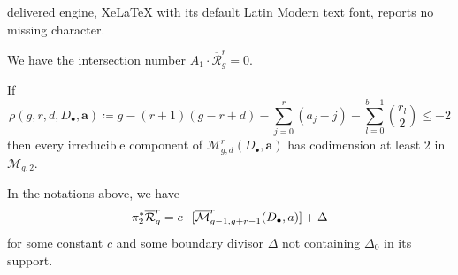 \documentclass[10pt,a4paper]{amsart}
\def\cM{\mathcal{M}}
\def\mm{\overline{\mathcal{M}}}
\def\rr{\overline{\mathcal{R}}}
\begin{document}
delivered engine, XeLaTeX with its default Latin Modern text font, reports no missing character.
\begin{prop} \label{testA_1}
	We have the intersection number $A_1\cdot \rr_g^r = 0$.
\end{prop}

\begin{prop} \label{rho-2} If 
	\[ \rho(g,r,d, D_\bullet, \textbf{a}) \coloneqq g-(r+1)(g-r+d)- \sum_{j=0}^{r}(a_j-j) - \sum_{l=0}^{b-1}\binom{r_l}{2} \leq -2 \]
	then every irreducible component of $\cM_{g,d}^r(D_\bullet, \textbf{a})$ has codimension at least $2$ in $\cM_{g,2}$.
\end{prop}

\begin{prop} \label{sBNpull} \normalfont In the notations above, we have 
	\[\pi_2^*\rr^r_g =  c\cdot[\mm^r_{g-1, g+r-1}\text{\large (}D_{\bullet}, \textbf{a}\text{\large )}] + \Delta \] 
	for some constant $c$ and some boundary divisor $\Delta$ not containing $\Delta_0$ in its support. 
\end{prop}
\end{document}
